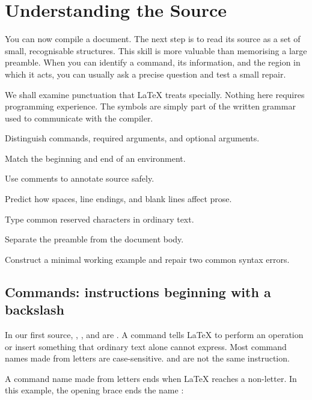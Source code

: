 \chapter{Understanding the Source}
\label{chap:source-anatomy}

You can now compile a document. The next step is to read its source as a set of
small, recognisable structures. This skill is more valuable than memorising a
large preamble. When you can identify a command, its information, and the
region in which it acts, you can usually ask a precise question and test a
small repair.

We shall examine punctuation that \LaTeX{} treats specially. Nothing here
requires programming experience. The symbols are simply part of the written
grammar used to communicate with the compiler.

\begin{learningoutcomes}
  \item Distinguish commands, required arguments, and optional arguments.
  \item Match the beginning and end of an environment.
  \item Use comments to annotate source safely.
  \item Predict how spaces, line endings, and blank lines affect prose.
  \item Type common reserved characters in ordinary text.
  \item Separate the preamble from the document body.
  \item Construct a minimal working example and repair two common syntax
        errors.
\end{learningoutcomes}

\section{Commands: instructions beginning with a backslash}

In our first source, , , and  are
. A command tells \LaTeX{} to perform an operation or insert
something that ordinary text alone cannot express. Most command names made
from letters are case-sensitive.  and 
are not the same instruction.

A command name made from letters ends when \LaTeX{} reaches a non-letter. In this
example, the opening brace ends the name :

